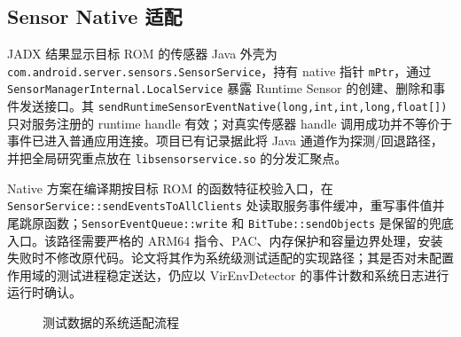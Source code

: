 \subsection{Sensor Native 适配}
JADX 结果显示目标 ROM 的传感器 Java 外壳为 \texttt{com.android.server.sensors.SensorService}，持有 native 指针 \texttt{mPtr}，通过 \texttt{SensorManagerInternal.LocalService} 暴露 Runtime Sensor 的创建、删除和事件发送接口。其 \texttt{sendRuntimeSensorEventNative(long,int,int,long,float[])} 只对服务注册的 runtime handle 有效；对真实传感器 handle 调用成功并不等价于事件已进入普通应用连接。项目已有记录据此将 Java 通道作为探测/回退路径，并把全局研究重点放在 \texttt{libsensorservice.so} 的分发汇聚点。

Native 方案在编译期按目标 ROM 的函数特征校验入口，在 \texttt{SensorService::sendEventsToAllClients} 处读取服务事件缓冲，重写事件值并尾跳原函数；\texttt{SensorEventQueue::write} 和 \texttt{BitTube::sendObjects} 是保留的兜底入口。该路径需要严格的 ARM64 指令、PAC、内存保护和容量边界处理，安装失败时不修改原代码。论文将其作为系统级测试适配的实现路径；其是否对未配置作用域的测试进程稳定送达，仍应以 VirEnvDetector 的事件计数和系统日志进行运行时确认。

\begin{figure}[htbp]
\centering
{}
\caption{测试数据的系统适配流程}
\label{fig:dataflow}
\end{figure}